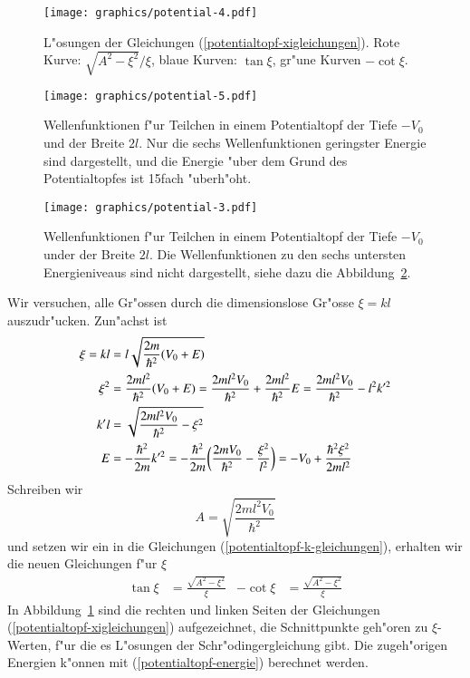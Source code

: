 \begin{figure}
\centering
\texttt{[image: graphics/potential-4.pdf]}
\caption{L"osungen der Gleichungen (\ref{potentialtopf-xigleichungen}).
Rote Kurve: $\sqrt{A^2-\xi^2}/\xi$, blaue Kurven: $\tan\xi$, gr"une
Kurven $-\cot\xi$.
\label{loesungen-xigleichungen}}
\end{figure}%
\begin{figure}
\centering
\texttt{[image: graphics/potential-5.pdf]}
\caption{Wellenfunktionen f"ur Teilchen in einem Potentialtopf der
Tiefe $-V_0$ und der Breite $2l$. Nur die sechs Wellenfunktionen 
geringster Energie sind dargestellt, und die Energie "uber dem
Grund des Potentialtopfes ist 15fach "uberh"oht.
\label{potentialtopf-loesungen-klein}}
\end{figure}
\begin{figure}
\centering
\texttt{[image: graphics/potential-3.pdf]}
\caption{Wellenfunktionen f"ur Teilchen in einem Potentialtopf der
Tiefe $-V_0$ under der Breite $2l$. Die Wellenfunktionen zu den sechs
untersten Energieniveaus sind nicht dargestellt, siehe dazu die
Abbildung~\ref{potentialtopf-loesungen-klein}.
\label{potentialtopf-loesungen}}
\end{figure}
Wir versuchen, alle Gr"ossen durch die dimensionslose Gr"osse $\xi=kl$
auszudr"ucken.
Zun"achst ist
\begin{align}
\xi=kl&=l\sqrt{\frac{2m}{\hbar^2}(V_0+E)}
\notag
\\
\xi^2
&=
\frac{2ml^2}{\hbar^2}(V_0+E)
=
\frac{2ml^2V_0}{\hbar^2} +\frac{2ml^2}{\hbar^2}E
=
\frac{2ml^2V_0}{\hbar^2}-l^2k'^2
\notag
\\
k'l
&=
\sqrt{\frac{2ml^2V_0}{\hbar^2} - \xi^2}
\notag
\\
E
&=
-\frac{\hbar^2}{2m}k'^2
=
-\frac{\hbar^2}{2m}
\biggl(
\frac{2mV_0}{\hbar^2} - \frac{\xi^2}{l^2}
\biggr)
=
-V_0+\frac{\hbar^2\xi^2}{2ml^2}
\label{potentialtopf-energie}
\end{align}
Schreiben wir
\[
A=\sqrt{\frac{2ml^2V_0}{\hbar^2}}
\]
und setzen wir ein in die Gleichungen (\ref{potentialtopf-k-gleichungen}),
erhalten wir die neuen Gleichungen f"ur $\xi$
\begin{align}
\tan \xi&=\frac{\sqrt{A^2-\xi^2}}{\xi}
&
-\cot \xi&=\frac{\sqrt{A^2-\xi^2}}{\xi}
\label{potentialtopf-xigleichungen}
\end{align}
In Abbildung~\ref{loesungen-xigleichungen} sind die rechten und linken
Seiten der Gleichungen (\ref{potentialtopf-xigleichungen}) aufgezeichnet,
die Schnittpunkte geh"oren zu $\xi$-Werten, f"ur die es L"osungen
der Schr"odingergleichung gibt.
Die zugeh"origen Energien k"onnen mit (\ref{potentialtopf-energie})
berechnet werden.


